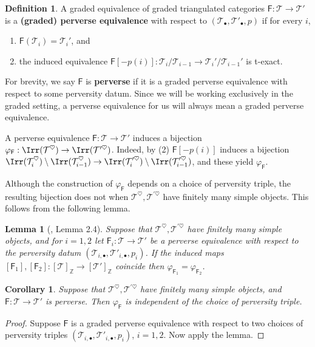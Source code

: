 \documentclass[11pt,reqno]{amsart}
\numberwithin{equation}{section}
\newtheorem{Lemma}[equation]{Lemma}
\newtheorem{Corollary}[equation]{Corollary}
\theoremstyle{definition}
\newtheorem{Definition}[equation]{Definition}
\theoremstyle{named}
\newcommand{\sF}{\mathsf{F}}
\newcommand{\cT}{\mathcal{T}}
\newcommand{\ZZ}{\mathbb{Z}}
\begin{document}
\begin{Definition}\label{def:PE}
A graded equivalence of graded triangulated categories $\sF:\cT\to\cT'$ is a \textbf{(graded) perverse equivalence} with respect to $(\cT_\bullet, \cT'_\bullet, p)$ if for every $i$, 
\begin{enumerate}
\item $\sF(\cT_i)= \cT_i'$, and
\item the induced equivalence $\sF[-p(i)]:\cT_i/\cT_{i-1}\to \cT_i'/\cT_{i-1}'$ is t-exact.
\end{enumerate}
\end{Definition}
For brevity, we say $\sF$ is \textbf{perverse} if it is a graded perverse equivalence with respect to some perversity datum.  Since we will be working exclusively in the graded setting, a perverse equivalence for us will always mean a graded perverse equivalence.    

A perverse equivalence $\sF:\cT\to\cT'$  induces a bijection $\varphi_\sF:\Irr(\cT^\heartsuit) \to \Irr(\cT^{\prime\heartsuit})$.  Indeed, by (2) $\sF[-p(i)]$ induces a bijection $\Irr(\cT_i^\heartsuit)\setminus \Irr(\cT_{i-1}^\heartsuit) \to \Irr(\cT_i^{\prime\heartsuit})\setminus \Irr(\cT_{i-1}^{\prime\heartsuit})$, and these yield $\varphi_\sF$.


Although the construction of $\varphi_\sF$ depends on a choice of perversity triple, the resulting bijection does not when $\cT^\heartsuit,\cT^{\prime\heartsuit}$ have finitely many simple objects.  This follows from the following lemma.
 

\begin{Lemma}[\cite{LosCacti}, Lemma 2.4]\label{lem:LosLem}
 Suppose that $\cT^\heartsuit,\cT^{\prime\heartsuit}$ have finitely many simple objects, and for $i=1,2$ let $\sF_i:\cT \to \cT'$ be a  perverse equivalence with respect to the perversity datum $(\cT_{i,\bullet}, \cT'_{i,\bullet}, p_i)$.  If the induced maps $[\sF_1],[\sF_2]:[\cT]_\ZZ \to [\cT']_\ZZ$ coincide then $\varphi_{\sF_1}=\varphi_{\sF_2}$.
 \end{Lemma}
 
 \begin{Corollary}
 Suppose that $\cT^\heartsuit,\cT^{\prime\heartsuit}$ have finitely many simple objects, and  $\sF:\cT \to \cT'$ is perverse.  Then $\varphi_\sF$ is independent of the choice of perversity triple.
 \end{Corollary}
 
 \begin{proof}
Suppose $\sF$ is a graded perverse equivalence with respect to two choices of perversity triples $(\cT_{i,\bullet}, \cT'_{i,\bullet}, p_i)$, $i=1,2$.  Now apply the lemma.
 \end{proof}
 
\end{document}

